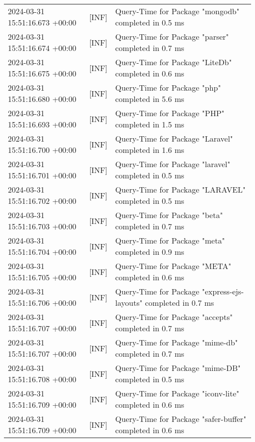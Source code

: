 {{\begin{tabularx}{\textwidth}{|l|l|X|}
                    2024-03-31 15:51:16.673 +00:00 & [INF] & Query-Time for Package "mongodb" completed in 0.5 ms \\
                    2024-03-31 15:51:16.674 +00:00 & [INF] & Query-Time for Package "parser" completed in 0.7 ms \\
                    2024-03-31 15:51:16.675 +00:00 & [INF] & Query-Time for Package "LiteDb" completed in 0.6 ms \\
                    2024-03-31 15:51:16.680 +00:00 & [INF] & Query-Time for Package "php" completed in 5.6 ms \\
                    2024-03-31 15:51:16.693 +00:00 & [INF] & Query-Time for Package "PHP" completed in 1.5 ms \\
                    2024-03-31 15:51:16.700 +00:00 & [INF] & Query-Time for Package "Laravel" completed in 1.6 ms \\
                    2024-03-31 15:51:16.701 +00:00 & [INF] & Query-Time for Package "laravel" completed in 0.5 ms \\
                    2024-03-31 15:51:16.702 +00:00 & [INF] & Query-Time for Package "LARAVEL" completed in 0.5 ms \\
                    2024-03-31 15:51:16.703 +00:00 & [INF] & Query-Time for Package "beta" completed in 0.7 ms \\
                    2024-03-31 15:51:16.704 +00:00 & [INF] & Query-Time for Package "meta" completed in 0.9 ms \\
                    2024-03-31 15:51:16.705 +00:00 & [INF] & Query-Time for Package "META" completed in 0.6 ms \\
                    2024-03-31 15:51:16.706 +00:00 & [INF] & Query-Time for Package "express-ejs-layouts" completed in 0.7 ms \\
                    2024-03-31 15:51:16.707 +00:00 & [INF] & Query-Time for Package "accepts" completed in 0.7 ms \\
                    2024-03-31 15:51:16.707 +00:00 & [INF] & Query-Time for Package "mime-db" completed in 0.7 ms \\
                    2024-03-31 15:51:16.708 +00:00 & [INF] & Query-Time for Package "mime-DB" completed in 0.5 ms \\
                    2024-03-31 15:51:16.709 +00:00 & [INF] & Query-Time for Package "iconv-lite" completed in 0.6 ms \\
                    2024-03-31 15:51:16.709 +00:00 & [INF] & Query-Time for Package "safer-buffer" completed in 0.6 ms \\

\end{tabularx}}}
